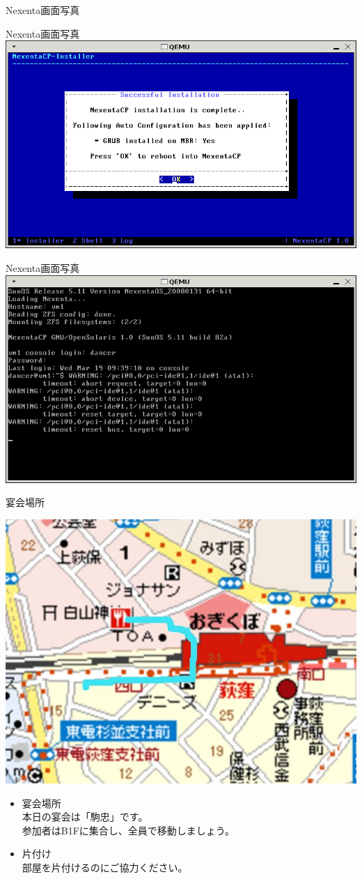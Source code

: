 \documentclass[cjk,dvipdfmx,12pt]{beamer}
\begin{document}
\begin{frame}{Nexenta画面写真}
\end{frame}\begin{frame}{Nexenta画面写真} 
\includegraphics[width=1.0\hsize]{image200804/nexenta22.png}
\end{frame}\begin{frame}{Nexenta画面写真} 
\includegraphics[width=1.0\hsize]{image200804/nexenta23.png}
\end{frame}

\begin{frame}{宴会場所}
\begin{center}
 \includegraphics[width=0.5\hsize]{image200804/enkaimap.jpg}
\end{center}

\begin{itemize}
 \item 宴会場所\\
       本日の宴会は「駒忠」です。\\
       参加者はB1Fに集合し、全員で移動しましょう。
 \item 片付け\\
       部屋を片付けるのにご協力ください。
\end{itemize}

\end{frame}
\end{document}
